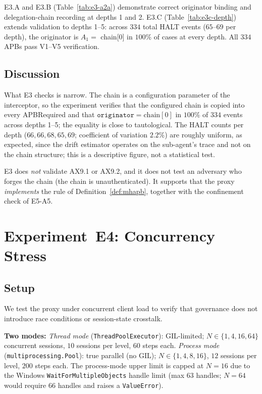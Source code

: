 \documentclass[11pt]{article}
\begin{document}


\noindent
E3.A and E3.B (Table~\ref{tab:e3-a2a}) demonstrate correct originator binding and delegation-chain recording at depths 1 and 2.
E3.C (Table~\ref{tab:e3c-depth}) extends validation to depths 1--5:
across $334$ total HALT events ($65$--$69$ per depth),
the originator is $A_1 =$ chain[0] in $100\%$ of cases at every depth.
All $334$ APBs pass V1--V5 verification.

\subsection{Discussion}

What E3 checks is narrow. The chain is a configuration parameter of
the interceptor, so the experiment verifies that the configured chain
is copied into every APBRequired and that $\texttt{originator} =
\text{chain}[0]$ in $100\%$ of $334$ events across depths 1--5; the
equality is close to tautological. The HALT counts per depth
($66,66,68,65,69$; coefficient of variation $2.2\%$) are roughly
uniform, as expected, since the drift estimator operates on the
sub-agent's trace and not on the chain structure; this is a descriptive
figure, not a statistical test.

E3 does \emph{not} validate AX9.1 or AX9.2, and it does not test an
adversary who forges the chain (the chain is unauthenticated). It
supports that the proxy \emph{implements} the rule of
Definition~\ref{def:mhapb}, together with the confinement check of E5-A5.

\section{Experiment~E4: Concurrency Stress}
\label{sec:exp4}

\subsection{Setup}

We test the proxy under concurrent client load to verify that
governance does not introduce race conditions or session-state crosstalk.

\textbf{Two modes:}
\emph{Thread mode} (\texttt{ThreadPoolExecutor}): GIL-limited; $N \in \{1,4,16,64\}$
concurrent sessions, $10$ sessions per level, $60$ steps each.
\emph{Process mode} (\texttt{multiprocessing.Pool}): true parallel (no GIL);
$N \in \{1,4,8,16\}$, $12$ sessions per level, $200$ steps each.
The process-mode upper limit is capped at $N{=}16$ due to the Windows
\texttt{WaitForMultipleObjects} handle limit (max 63 handles; $N{=}64$
would require 66 handles and raises a \texttt{ValueError}).
\end{document}
